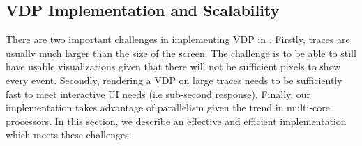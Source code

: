 \subsection{VDP Implementation and Scalability}
\label{sec:lviz-imp}

There are two important challenges in implementing VDP in .
Firstly, traces are usually much larger than the size of the screen.
The challenge is to be able to still have usable visualizations given that
there will not be sufficient pixels to show every event.
Secondly, rendering a VDP on large traces needs to be sufficiently fast to
meet interactive UI needs (i.e sub-second response).
Finally, our implementation takes advantage of parallelism given
the trend in multi-core processors.
In this section, we describe an effective and efficient implementation
which meets these challenges.



